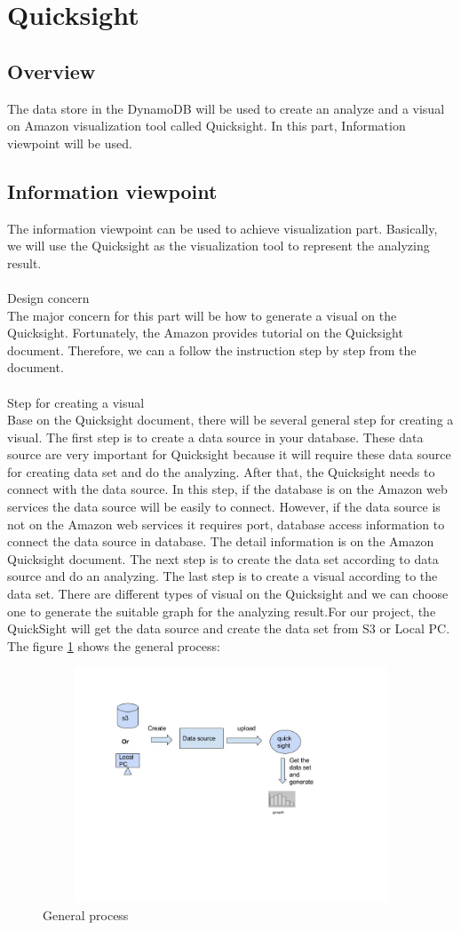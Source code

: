  \section{Quicksight}
    \subsection{Overview}
    The data store in the DynamoDB will be used to create an analyze and a visual on Amazon visualization tool called Quicksight. In this part, Information viewpoint will be used.
    \subsection{Information viewpoint}
    The information viewpoint can be used to achieve visualization part. Basically, we will use the Quicksight as the visualization tool to represent the analyzing result.\\
\\
    Design concern \\
    The major concern for this part will be how to generate a visual on the Quicksight. Fortunately, the Amazon provides tutorial on the Quicksight document. Therefore, we can a follow the instruction step by step from the document.\\
\\    
    Step for creating a visual\\
    Base on the Quicksight document, there will be several general step for creating a visual. The first step is to create a data source in your database. These data source are very important for Quicksight because it will require these data source for creating data set and do the analyzing. After that, the Quicksight needs to connect with the data source. In this step, if the database is on the Amazon web services the data source will be easily to connect. However, if the data source is not on the Amazon web services it requires port, database access information to connect the data source in database. The detail information is on the Amazon Quicksight document. The next step is to create the data set according to data source and do an analyzing. The last step is to create a visual according to the data set. There are different types of visual on the Quicksight and we can choose one to generate the suitable graph for the analyzing result.\cite{w4}For our project, the QuickSight will get the data source and create the data set from S3 or Local PC.\\
    The figure \ref{fig:2} shows the general process:
    \begin{figure}[h]
    \includegraphics[width=16cm, height=7cm]{6.jpg}
    \centering
    \caption{\label{fig:2}General process}
    \end{figure}

